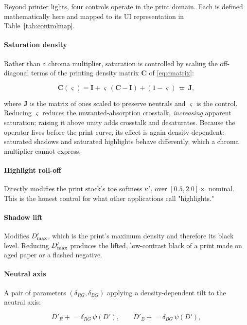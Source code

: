 Beyond printer lights, four controls operate in the print domain. Each is
defined mathematically here and mapped to its UI representation in
Table~\ref{tab:controlmap}.

\paragraph{Saturation density} Rather than a chroma multiplier, saturation is
controlled by scaling the off-diagonal terms of the printing density matrix
$\mathbf{C}$ of \eqref{eq:cmatrix}:

\begin{equation}
\mathbf{C}(\varsigma) = \mathbf{I} + \varsigma\,(\mathbf{C} - \mathbf{I}) + (1-\varsigma)\,\varpi\,\mathbf{J},
\label{eq:satdensity}
\end{equation}

where $\mathbf{J}$ is the matrix of ones scaled to preserve neutrals and
$\varsigma$ is the control. Reducing $\varsigma$ reduces the unwanted-absorption
crosstalk, \emph{increasing} apparent saturation; raising it above unity adds
crosstalk and desaturates. Because the operator lives before the print curve, its
effect is again density-dependent: saturated shadows and saturated highlights
behave differently, which a chroma multiplier cannot express.

\paragraph{Highlight roll-off} Directly modifies the print stock's toe softness
$\kappa'_t$ over $[0.5, 2.0]\times$ nominal. This is the honest control for what
other applications call "highlights."

\paragraph{Shadow lift} Modifies $D_{\max}'$, which is the print's maximum density
and therefore its black level. Reducing $D_{\max}'$ produces the lifted,
low-contrast black of a print made on aged paper or a flashed negative.

\paragraph{Neutral axis} A pair of parameters $(\delta_{RG}, \delta_{BG})$
applying a density-dependent tilt to the neutral axis:

\begin{equation}
D'_R \mathrel{+}= \delta_{RG}\, \psi(D'), \qquad
D'_B \mathrel{+}= \delta_{BG}\, \psi(D'),
\label{eq:neutralaxis}
\end{equation}

